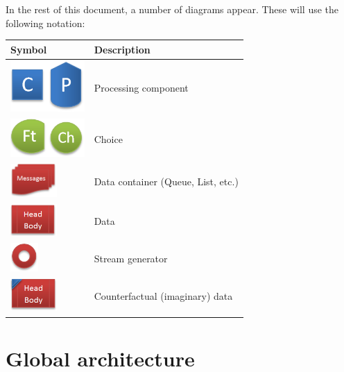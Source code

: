 \documentclass[]{scrartcl}
\theoremstyle{break}
\begin{document}
In the rest of this document, a number of diagrams appear. These will use the following notation:

\begin{center}
	\begin{tabular}{p{}@{}p{}@{}}
		\toprule
		Symbol & Description\\
		\midrule
		\includegraphics[width=80pt]{figs/legend_proc.png} \dotfill & Processing component\\
		\includegraphics[width=80pt]{figs/legend_choice.png} \dotfill & Choice\\
		\includegraphics[width=50pt]{figs/legend_container.png} \dotfill & Data container (Queue, List, etc.)\\
		\includegraphics[width=50pt]{figs/legend_data.png} \dotfill & Data\\
		\includegraphics[width=30pt]{figs/legend_generator.png} \dotfill & Stream generator\\
		\includegraphics[width=50pt]{figs/legend_imaginary.png} \dotfill & Counterfactual (imaginary) data\\
		\bottomrule
	\end{tabular}
\end{center}

\section{Global architecture}\label{sec:globalArchitecture}
\end{document}
